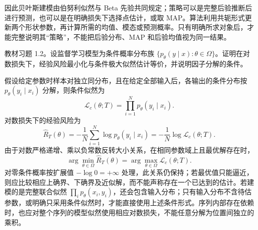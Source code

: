 \begin{solve}
因此贝叶斯建模由伯努利似然与 Beta 先验共同规定；策略可以是完整后验推断后进行预测，也可以是在明确损失下选择点估计，或取 MAP。算法利用共轭形式更新两个形状参数，再计算所需的均值、模态或预测概率。只有明确所求对象后，才能完整说明其“策略”，不能把后验分布、MAP 和后验均值视为同一结果。
\end{solve}

\begin{example}
\label{ex:lh-erm-mle}
教材习题 1.2。设监督学习模型为条件概率分布族 $\{p_\theta(y\mid x):\theta\in\Omega\}$。证明在对数损失下，经验风险最小化与条件极大似然估计等价，并说明因子分解的条件。
\end{example}
\begin{solve}
假设给定参数时样本对独立同分布，且在给定全部输入后，各输出的条件分布按 $p_\theta(y_i\mid x_i)$ 分解，则条件似然为
\[
    \mathcal L_c(\theta;T)
       =\prod_{i=1}^N p_\theta(y_i\mid x_i).
\]
对数损失下的经验风险为
\[
    \widehat R_T(\theta)
       =-\frac1N\sum_{i=1}^N\log p_\theta(y_i\mid x_i)
       =-\frac1N\log\mathcal L_c(\theta;T).
\]
由于对数严格递增、乘以负常数反转大小关系，在相同参数域上且最优解存在时，
\[
    \arg\min_{\theta\in\Omega}\widehat R_T(\theta)
       =\arg\max_{\theta\in\Omega}\mathcal L_c(\theta;T).
\]
对零条件概率按扩展值 $-\log0=+\infty$ 处理，此关系仍保持；若最优值只能逼近，则应比较相应上确界、下确界及近似解，而不能声称存在一个已达到的估计。若建模的是完整联合似然 $\prod_i p_\theta(x_i,y_i)$，还会包含输入分布；只有输入分布不含待估参数，或明确只采用条件似然时，才能直接使用上述条件形式。序列内部存在依赖时，也应对整个序列的模型似然使用相应对数损失，不能任意分解为位置间独立的乘积。
\end{solve}







